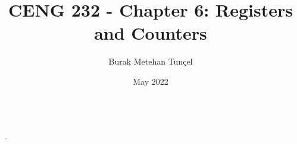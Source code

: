 \documentclass{article}
\title{CENG 232 - Chapter 6: Registers and Counters}
\author{Burak Metehan Tunçel}
\date{May 2022}
\makeatletter
\renewcommand\maketitle{
{\raggedright %
\begin{center}
{\Large \bfseries \@title}\\[2ex] 
{\large \@author \ - \@date}\\[2ex]
\end{center}}} %
\makeatother
\begin{document}
\maketitle

\begin{multicols}{2}
\setlength{\columnsep}{1.5cm}
\setlength{\columnseprule}{0.2pt}













\end{multicols}
\end{document}
